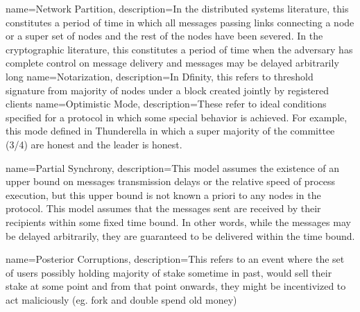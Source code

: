 \documentclass{article}
\begin{document}
{
    name=Network Partition,
    description={In the distributed systems literature, this constitutes a period of time in which all messages passing links connecting a node or a super set of nodes and the rest of the nodes have been severed. In the cryptographic literature, this constitutes a period of time when the adversary has complete control on message delivery and messages may be delayed arbitrarily long \cite{AttiyaWelch}}
}
{
    name=Notarization,
    description={In Dfinity, this refers to threshold signature from majority of nodes under a block created jointly by registered clients \cite{Dfinity}}
}
{
    name=Optimistic Mode,
    description={These refer to ideal conditions specified for a protocol in which some special behavior is achieved. For example, this mode defined in Thunderella in which a super majority of the committee (3/4) are honest and the leader is honest. \cite{thunderella}}
}

{
    name=Partial Synchrony,
    description={This model assumes the existence of an upper bound on messages transmission delays or the relative speed of process execution, but this upper bound is not known a priori to any nodes in the protocol. This model assumes that the messages sent are received by their recipients within some fixed time bound. In other words, while the messages may be delayed arbitrarily, they are guaranteed to be delivered within the time bound. \cite{mahdiz}}
}

{
    name=Posterior Corruptions,
    description={This refers to an event where the set of users possibly holding majority of stake sometime in past, would sell their stake at some point and from that point onwards, they might be incentivized to act maliciously (eg. fork and double spend old money) \cite{thunderella}}
}

\end{document}
